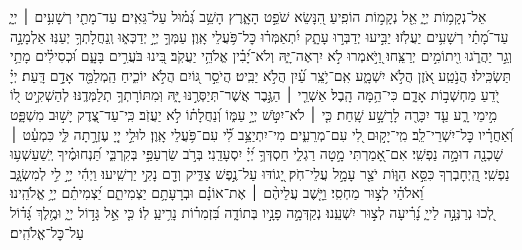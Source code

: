 {\begin{narrow}
	\end{narrow}
	
	\begin{narrow}
		אֵל־נְקָמ֥וֹת יְיָ֑ אֵ֖ל נְקָמ֣וֹת הוֹפִֽיעַ׃
		הִ֭נָּשֵׂא שֹׁפֵ֣ט הָאָ֑רֶץ הָשֵׁ֥ב גְּ֝מ֗וּל עַל־גֵּאִֽים׃
		עַד־מָתַ֖י רְשָׁעִ֥ים ׀ יְיָ֑ עַד־מָ֝תַ֗י רְשָׁעִ֥ים יַעֲלֹֽזוּ׃
		יַבִּ֣יעוּ יְדַבְּר֣וּ עָתָ֑ק יִ֝תְאַמְּר֗וּ כׇּל־פֹּ֥עֲלֵי אָֽוֶן׃
		עַמְּךָ֣ יְיָ֣ יְדַכְּא֑וּ וְֽנַחֲלָתְךָ֥ יְעַנּֽוּ׃
		אַלְמָנָ֣ה וְגֵ֣ר יַהֲרֹ֑גוּ וִ֖יתוֹמִ֣ים יְרַצֵּֽחוּ׃
		וַ֭יֹּ֣אמְרוּ לֹ֣א יִרְאֶה־יָּ֑הּ וְלֹא־יָ֝בִ֗ין אֱלֹהֵ֥י יַעֲקֹֽב׃
		בִּ֭ינוּ בֹּעֲרִ֣ים בָּעָ֑ם וּ֝כְסִילִ֗ים מָתַ֥י תַּשְׂכִּֽילוּ׃
		הֲנֹ֣טַֽע אֹ֭זֶן הֲלֹ֣א יִשְׁמָ֑ע אִֽם־יֹ֥צֵֽר עַ֗֝יִן הֲלֹ֣א יַבִּֽיט׃
		הֲיֹסֵ֣ר גּ֭וֹיִם הֲלֹ֣א יוֹכִ֑יחַ הַֽמְלַמֵּ֖ד אָדָ֣ם דָּֽעַת׃
		יְיָ֗ יֹ֭דֵעַ מַחְשְׁב֣וֹת אָדָ֑ם כִּי־הֵ֥מָּה הָֽבֶל׃
		אַשְׁרֵ֤י ׀ הַגֶּ֣בֶר אֲשֶׁר־תְּיַסְּרֶ֣נּוּ יָּ֑הּ וּֽמִתּוֹרָתְךָ֥ תְלַמְּדֶֽנּוּ׃
		לְהַשְׁקִ֣יט ל֭וֹ מִ֣ימֵי רָ֑ע עַ֤ד יִכָּרֶ֖ה לָרָשָׁ֣ע שָֽׁחַת׃
		כִּ֤י ׀ לֹא־יִטֹּ֣שׁ יְיָ֣ עַמּ֑וֹ וְ֝נַחֲלָת֗וֹ לֹ֣א יַעֲזֹֽב׃
		כִּֽי־עַד־צֶ֭דֶק יָשׁ֣וּב מִשְׁפָּ֑ט וְ֝אַחֲרָ֗יו כׇּל־יִשְׁרֵי־לֵֽב׃
		מִֽי־יָק֣וּם לִ֭י עִם־מְרֵעִ֑ים מִי־יִתְיַצֵּ֥ב לִ֗֝י עִם־פֹּ֥עֲלֵי אָֽוֶן׃
		לוּלֵ֣י יְיָ֭ עֶזְרָ֣תָה לִּ֑י כִּמְעַ֓ט ׀ שָׁכְנָ֖ה דוּמָ֣ה נַפְשִֽׁי׃
		אִם־אָ֭מַרְתִּי מָ֣טָה רַגְלִ֑י חַסְדְּךָ֥ יְ֝יָ֗ יִסְעָדֵֽנִי׃
		בְּרֹ֣ב שַׂרְעַפַּ֣י בְּקִרְבִּ֑י תַּ֝נְחוּמֶ֗יךָ יְֽשַׁעַשְׁע֥וּ נַפְשִֽׁי׃
		הַֽ֭יְחׇבְרְךָ כִּסֵּ֣א הַוּ֑וֹת יֹצֵ֖ר עָמָ֣ל עֲלֵי־חֹֽק׃
		יָ֭גוֹדּוּ עַל־נֶ֣פֶשׁ צַדִּ֑יק וְדָ֖ם נָקִ֣י יַרְשִֽׁיעוּ׃
		וַיְהִ֬י יְיָ֣ לִ֣י לְמִשְׂגָּ֑ב וֵ֝אלֹהַ֗י לְצ֣וּר מַחְסִֽי׃
		וַיָּ֤שֶׁב עֲלֵיהֶ֨ם ׀ אֶת־אוֹנָ֗ם וּבְרָעָתָ֥ם יַצְמִיתֵ֑ם יַ֝צְמִיתֵ֗ם יְיָ֥ אֱלֹהֵֽינוּ׃\\
		לְ֭כוּ נְרַנְּנָ֣ה לַייָ֑ נָ֝רִ֗יעָה לְצ֣וּר יִשְׁעֵֽנוּ׃
		נְקַדְּמָ֣ה פָנָ֣יו בְּתוֹדָ֑ה בִּ֝זְמִר֗וֹת נָרִ֥יעַֽ לֽוֹ׃
		כִּ֤י אֵ֣ל גָּד֣וֹל יְיָ֑ וּמֶ֥לֶךְ גָּ֝ד֗וֹל עַל־כׇּל־אֱלֹהִֽים׃
	\end{narrow}
	
}
